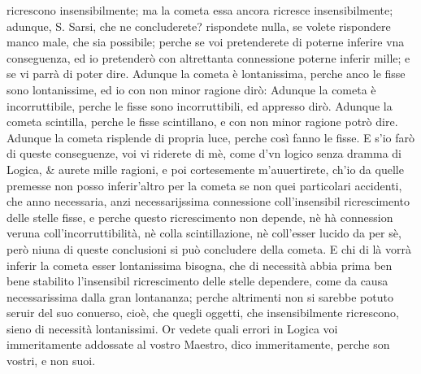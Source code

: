\documentclass[11pt,twoside,openany]{book}
\begin{document}
ricrescono insensibilmente; ma la cometa essa ancora ricresce insensibilmente; adunque, S. Sarsi, che ne concluderete? rispondete nulla, se volete rispondere manco male, che sia possibile; perche se voi pretenderete di poterne inferire vna conseguenza, ed io pretenderò con altrettanta connessione poterne inferir mille; e se vi parrà di poter dire. Adunque la cometa è lontanissima, perche anco le fisse sono lontanissime, ed io con non minor ragione dirò: Adunque la cometa è incorruttibile, perche le fisse sono incorruttibili, ed appresso dirò. Adunque la cometa scintilla, perche le fisse scintillano, e con non minor ragione potrò dire. Adunque la cometa risplende di propria luce, perche così fanno le fisse. E s'io farò di queste conseguenze, voi vi riderete di mè, come d'vn logico senza dramma di Logica, \& aurete mille ragioni, e poi cortesemente m'auuertirete, ch'io da quelle premesse non posso inferir'altro per la cometa se non quei particolari accidenti, che anno necessaria, anzi necessarijssima connessione coll'insensibil ricrescimento delle stelle fisse, e perche questo ricrescimento non depende, nè hà connession veruna coll'incorruttibilità, nè colla scintillazione, nè coll'esser lucido da per sè, però niuna di queste conclusioni si può concludere della cometa. E chi di là vorrà inferir la cometa esser lontanissima bisogna, che di necessità abbia prima ben bene stabilito l'insensibil ricrescimento delle stelle dependere, come da causa necessarissima dalla gran lontananza; perche altrimenti non si sarebbe potuto seruir del suo conuerso, cioè, che quegli oggetti, che insensibilmente ricrescono, sieno di necessità lontanissimi. Or vedete quali errori in Logica voi immeritamente addossate al vostro Maestro, dico immeritamente, perche son vostri, e non suoi.
\end{document}
